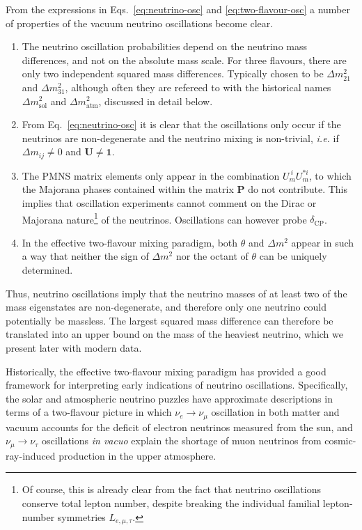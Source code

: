 From the expressions in Eqs.~\eqref{eq:neutrino-osc} and
\eqref{eq:two-flavour-osc} a number of properties of the vacuum neutrino
oscillations become clear.
\begin{enumerate}
  \item The neutrino oscillation probabilities depend on the neutrino mass
    differences, and not on the absolute mass scale. For three flavours, there
    are only two independent squared mass differences. Typically chosen to be
    $\Delta m_{21}^{2}$ and $\Delta m_{31}^{2}$, although often they are
    refereed to with the historical names $\Delta m_{\text{sol}}^{2}$ and
    $\Delta m_{\text{atm}}^{2}$, discussed in detail below.
  \item From Eq.~\eqref{eq:neutrino-osc} it is clear that the oscillations only
    occur if the neutrinos are non-degenerate and the neutrino mixing is
    non-trivial, \textit{i.e.} if $\Delta m_{ij} \neq 0$ and
    $\mathbf{U} \neq \mathbf{1}$.
  \item The PMNS matrix elements only appear in the combination
    $U_{m}^{\ i} U_{m}^{* i}$, to which the Majorana phases contained within the
    matrix $\mathbf{P}$ do not contribute. This implies that oscillation
    experiments cannot comment on the Dirac or Majorana nature\footnote{Of
    course, this is already clear from the fact that neutrino oscillations
    conserve total lepton number, despite breaking the individual familial
    lepton-number symmetries $L_{e, \mu, \tau}$.} of the neutrinos. Oscillations
    can however probe $\delta_{\text{CP}}$.
  \item In the effective two-flavour mixing paradigm, both $\theta$ and
    $\Delta m^{2}$ appear in such a way that neither the sign of $\Delta m^{2}$
    nor the octant of $\theta$ can be uniquely determined.
  \end{enumerate}
  Thus, neutrino oscillations imply that the neutrino masses of at least two of
  the mass eigenstates are non-degenerate, and therefore only one neutrino could
  potentially be massless. The largest squared mass difference can therefore be
  translated into an upper bound on the mass of the heaviest neutrino, which we
  present later with modern data.

  Historically, the effective two-flavour mixing paradigm has provided a good
  framework for interpreting early indications of neutrino oscillations.
  Specifically, the solar and atmospheric neutrino puzzles have approximate
  descriptions in terms of a two-flavour picture in which
  $\nu_{e} \to \nu_{\mu}$ oscillation in both matter and vacuum accounts for the
  deficit of electron neutrinos measured from the sun, and
  $\nu_{\mu} \to \nu_{\tau}$ oscillations \textit{in vacuo} explain the shortage
  of muon neutrinos from cosmic-ray-induced production in the upper atmosphere.

